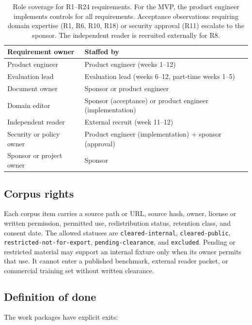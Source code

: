 \begin{table}[H]
\centering
\small
\begin{tabularx}{\textwidth}{@{}p{}L@{}}
\toprule
Requirement owner & Staffed by \\
\midrule
Product engineer & Product engineer (weeks 1--12) \\
Evaluation lead & Evaluation lead (weeks 6--12, part-time weeks 1--5) \\
Document owner & Sponsor or product engineer \\
Domain editor & Sponsor (acceptance) or product engineer (implementation) \\
Independent reader & External recruit (week 11--12) \\
Security or policy owner & Product engineer (implementation) + sponsor (approval) \\
Sponsor or project owner & Sponsor \\
\bottomrule
\end{tabularx}
\caption{Role coverage for R1--R24 requirements. For the MVP, the product
engineer implements controls for all requirements. Acceptance observations
requiring domain expertise (R1, R6, R10, R18) or security approval (R11)
escalate to the sponsor. The independent reader is recruited externally for R8.}
\label{tab:role-coverage}
\end{table}

\subsection{Corpus rights}

Each corpus item carries a source path or URL, source hash, owner,
license or written permission, permitted use, redistribution status, retention
class, and consent date. The allowed statuses are
\texttt{cleared-internal}, \texttt{cleared-public},
\texttt{restricted-not-for-export}, \texttt{pending-clearance}, and
\texttt{excluded}. Pending or restricted material may support an internal
fixture only when its owner permits that use. It cannot enter a published
benchmark, external reader packet, or commercial training set without written
clearance.

\subsection{Definition of done}

The work packages have explicit exits:

